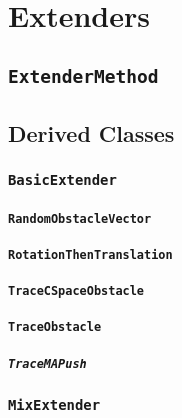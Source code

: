 \chapter{Extenders}

\section{\texttt{ExtenderMethod}}

\section{Derived Classes}

\subsection{\texttt{BasicExtender}}

\subsubsection{\texttt{RandomObstacleVector}}

\subsubsection{\texttt{RotationThenTranslation}}

\subsubsection{\texttt{TraceCSpaceObstacle}}

\subsubsection{\texttt{TraceObstacle}}

\paragraph{\texttt{TraceMAPush}}

\subsection{\texttt{MixExtender}}

